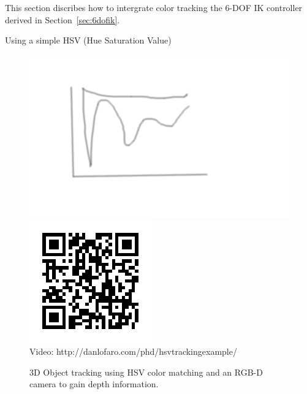 This section discribes how to intergrate color tracking the 6-DOF IK controller derived in Section~\ref{sec:6dofik}.


Using a simple HSV (Hue Saturation Value) 



\begin{figure}[thpb]
  \centering
      \includegraphics[width=0.93\columnwidth]{./pix/tmp.png}
      \includegraphics{./qrcode/qrcode-hsvtrackingexample.png}\\
      Video: http://danlofaro.com/phd/hsvtrackingexample/
\caption{3D Object tracking using HSV color matching and an RGB-D camera to gain depth information.}
\end{figure}
